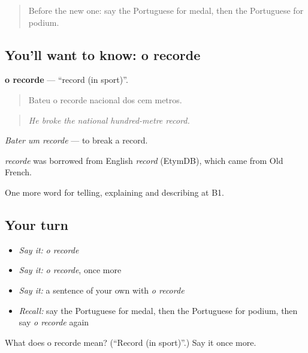\label{lesson:PT-C511-recorde}



\begin{quote}
Before the new one: say the Portuguese for medal, then the Portuguese for podium.
\end{quote}

\subsection*{You'll want to know: o recorde}
\textbf{o recorde} — \textquotedblleft{}record (in sport)\textquotedblright{}.

\begin{quote}
Bateu o recorde nacional dos cem metros.
\end{quote}

\begin{quote}
\emph{He broke the national hundred-metre record.}
\end{quote}

\emph{Bater um recorde} — to break a record.

\begin{cousinweb}
\emph{recorde} was borrowed from English \emph{record} (EtymDB), which came from Old French.
\end{cousinweb}

\begin{grammarlens}[title={What you've built}]
One more word for telling, explaining and describing at B1.
\end{grammarlens}

\subsection*{Your turn}
\begin{itemize}
\raggedright
  \item \emph{Say it:} \emph{o recorde}
  \item \emph{Say it:} \emph{o recorde}, once more
  \item \emph{Say it:} a sentence of your own with \emph{o recorde}
  \item \emph{Recall:} say the Portuguese for medal, then the Portuguese for podium, then say \emph{o recorde} again
\end{itemize}

\begin{tcolorbox}[breakable,colback=teal!4,colframe=teal!35!black,title={Before you move on}]
What does o recorde mean? (\textquotedblleft{}Record (in sport)\textquotedblright{}.) Say it once more.
\end{tcolorbox}
